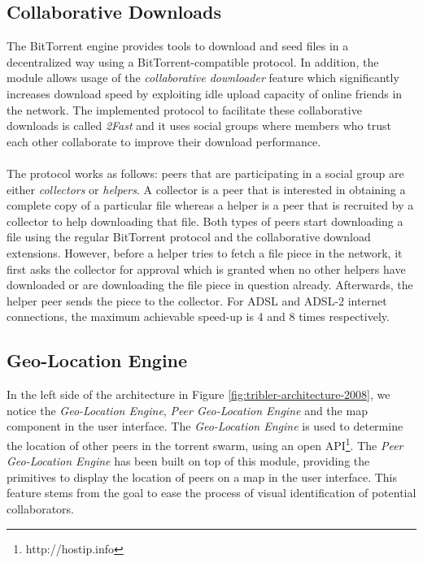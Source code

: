 \subsection{Collaborative Downloads}
The BitTorrent engine provides tools to download and seed files in a decentralized way using a BitTorrent-compatible protocol. In addition, the module allows usage of the \emph{collaborative downloader} feature which significantly increases download speed by exploiting idle upload capacity of online friends in the network. The implemented protocol to facilitate these collaborative downloads is called \emph{2Fast} and it uses social groups where members who trust each other collaborate to improve their download performance.\\\\
The protocol works as follows: peers that are participating in a social group are either \emph{collectors} or \emph{helpers}. A collector is a peer that is interested in obtaining a complete copy of a particular file whereas a helper is a peer that is recruited by a collector to help downloading that file. Both types of peers start downloading a file using the regular BitTorrent protocol and the collaborative download extensions. However, before a helper tries to fetch a file piece in the network, it first asks the collector for approval which is granted when no other helpers have downloaded or are downloading the file piece in question already. Afterwards, the helper peer sends the piece to the collector. For ADSL and ADSL-2 internet connections, the maximum achievable speed-up is 4 and 8 times respectively.

\subsection{Geo-Location Engine}
In the left side of the architecture in Figure \ref{fig:tribler-architecture-2008}, we notice the \emph{Geo-Location Engine}, \emph{Peer Geo-Location Engine} and the map component in the user interface. The \emph{Geo-Location Engine} is used to determine the location of other peers in the torrent swarm, using an open  API\footnote{http://hostip.info}. The \emph{Peer Geo-Location Engine} has been built on top of this module, providing the primitives to display the location of peers on a map in the user interface. This feature stems from the goal to ease the process of visual identification of potential collaborators.

